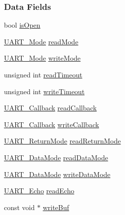 \subsubsection*{Data Fields}
\begin{DoxyCompactItemize}
\item 
bool \hyperlink{struct_u_a_r_t_u_s_c_i_a___object_a95e071a9a1ef58077fa291a1ca259419}{is\+Open}
\item 
\hyperlink{_u_a_r_t_8h_a2507a620dba95cd20885c52494d19e90}{U\+A\+R\+T\+\_\+\+Mode} \hyperlink{struct_u_a_r_t_u_s_c_i_a___object_adfec51b396201813714b974e701e4ae2}{read\+Mode}
\item 
\hyperlink{_u_a_r_t_8h_a2507a620dba95cd20885c52494d19e90}{U\+A\+R\+T\+\_\+\+Mode} \hyperlink{struct_u_a_r_t_u_s_c_i_a___object_a89a3f17c6f31eb4230207ced907c6896}{write\+Mode}
\item 
unsigned int \hyperlink{struct_u_a_r_t_u_s_c_i_a___object_afa9d6ee70b6cac8e628b3c2cbec671a6}{read\+Timeout}
\item 
unsigned int \hyperlink{struct_u_a_r_t_u_s_c_i_a___object_af7c719eea095f7c01540d20e7412b5c4}{write\+Timeout}
\item 
\hyperlink{_u_a_r_t_8h_a44620a9d91e0357ebc6f0a79984d9e1e}{U\+A\+R\+T\+\_\+\+Callback} \hyperlink{struct_u_a_r_t_u_s_c_i_a___object_a587d4152d42d0ed87571ad92f9544a8f}{read\+Callback}
\item 
\hyperlink{_u_a_r_t_8h_a44620a9d91e0357ebc6f0a79984d9e1e}{U\+A\+R\+T\+\_\+\+Callback} \hyperlink{struct_u_a_r_t_u_s_c_i_a___object_a52f389cdd1f7697efc7f4e26db6bf81e}{write\+Callback}
\item 
\hyperlink{_u_a_r_t_8h_acb5a82843435a1b5d51b6c27028d914f}{U\+A\+R\+T\+\_\+\+Return\+Mode} \hyperlink{struct_u_a_r_t_u_s_c_i_a___object_a8e73b75aaf08299cc0473a5294c86cde}{read\+Return\+Mode}
\item 
\hyperlink{_u_a_r_t_8h_a694090fdb166f94ac30b809f9cba87b8}{U\+A\+R\+T\+\_\+\+Data\+Mode} \hyperlink{struct_u_a_r_t_u_s_c_i_a___object_a9f9f57b5533716570a821f6d8e306443}{read\+Data\+Mode}
\item 
\hyperlink{_u_a_r_t_8h_a694090fdb166f94ac30b809f9cba87b8}{U\+A\+R\+T\+\_\+\+Data\+Mode} \hyperlink{struct_u_a_r_t_u_s_c_i_a___object_af5d49681bcb7ff9b30235e03d0075f30}{write\+Data\+Mode}
\item 
\hyperlink{_u_a_r_t_8h_aac6a03c2e1d76f53e1d9d923dcdc24f2}{U\+A\+R\+T\+\_\+\+Echo} \hyperlink{struct_u_a_r_t_u_s_c_i_a___object_a55738ed4a75cf397788c52695349240f}{read\+Echo}
\item 
const void $\ast$ \hyperlink{struct_u_a_r_t_u_s_c_i_a___object_a3f9618be43ad4439553aac79181ca845}{write\+Buf}

\end{DoxyCompactItemize}
